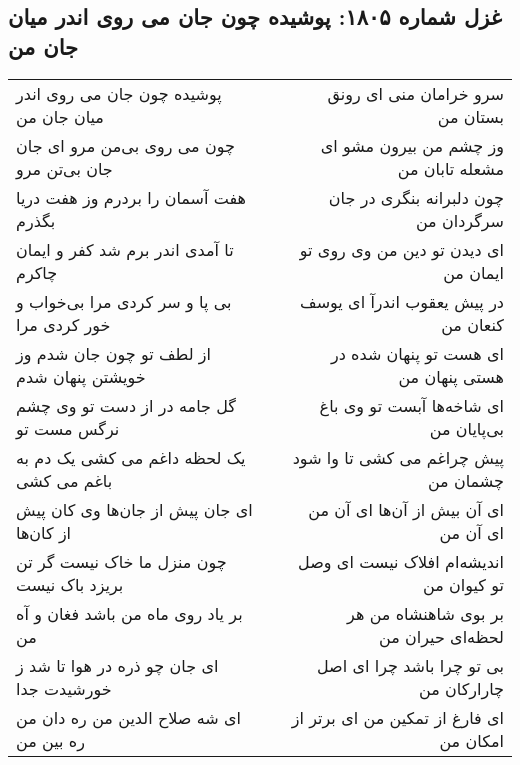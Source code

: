 \begin{center}
\section*{غزل شماره ۱۸۰۵: پوشیده چون جان می روی اندر میان جان من}
\label{sec:1805}
\begin{longtable}{l p{0.5cm} r}
پوشیده چون جان می روی اندر میان جان من
&&
سرو خرامان منی ای رونق بستان من
\\
چون می روی بی‌من مرو ای جان جان بی‌تن مرو
&&
وز چشم من بیرون مشو ای مشعله تابان من
\\
هفت آسمان را بردرم وز هفت دریا بگذرم
&&
چون دلبرانه بنگری در جان سرگردان من
\\
تا آمدی اندر برم شد کفر و ایمان چاکرم
&&
ای دیدن تو دین من وی روی تو ایمان من
\\
بی پا و سر کردی مرا بی‌خواب و خور کردی مرا
&&
در پیش یعقوب اندرآ ای یوسف کنعان من
\\
از لطف تو چون جان شدم وز خویشتن پنهان شدم
&&
ای هست تو پنهان شده در هستی پنهان من
\\
گل جامه در از دست تو وی چشم نرگس مست تو
&&
ای شاخه‌ها آبست تو وی باغ بی‌پایان من
\\
یک لحظه داغم می کشی یک دم به باغم می کشی
&&
پیش چراغم می کشی تا وا شود چشمان من
\\
ای جان پیش از جان‌ها وی کان پیش از کان‌ها
&&
ای آن بیش از آن‌ها ای آن من ای آن من
\\
چون منزل ما خاک نیست گر تن بریزد باک نیست
&&
اندیشه‌ام افلاک نیست ای وصل تو کیوان من
\\
بر یاد روی ماه من باشد فغان و آه من
&&
بر بوی شاهنشاه من هر لحظه‌ای حیران من
\\
ای جان چو ذره در هوا تا شد ز خورشیدت جدا
&&
بی تو چرا باشد چرا ای اصل چارارکان من
\\
ای شه صلاح الدین من ره دان من ره بین من
&&
ای فارغ از تمکین من ای برتر از امکان من
\\
\end{longtable}
\end{center}
